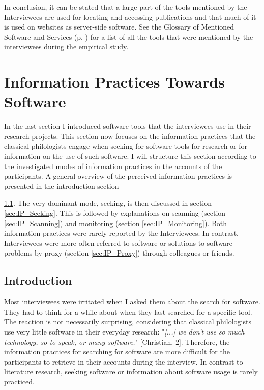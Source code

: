 \documentclass[12pt, a4paper, titlepage, oneside, abstract=true, toc=listof, toc=bibliography]{scrreprt}
\begin{document}
In conclusion, it can be stated that a large part of the tools mentioned by the Interviewees are used for locating and accessing publications and that much of it is used on websites as server-side software. See the Glossary of Mentioned Software and Services (p. \pageref{sec:glossary}) for a list of all the tools that were mentioned by the interviewees during the empirical study.

\section{Information Practices Towards Software}
\label{sec:IP_SW}
In the last section I introduced software tools that the interviewees use in their research projects. This section now focuses on the information practices that the classical philologists engage when seeking for software tools for research or for information on the use of such software. I will structure this section according to the investigated modes of information practices in the accounts of the participants. A general overview of the perceived information practices is presented in the introduction section {\ref{sec:IP_Introduction}. The very dominant mode, seeking, is then discussed in section \ref{sec:IP_Seeking}. This is followed by explanations on scanning (section \ref{sec:IP_Scanning}) and monitoring (section \ref{sec:IP_Monitoring}). Both information practices were rarely reported by the Interviewees. In contrast, Interviewees were more often referred to software or solutions to software problems by proxy (section \ref{sec:IP_Proxy}) through colleagues or friends.

\subsection{Introduction}
\label{sec:IP_Introduction}
Most interviewees were irritated when I asked them about the search for software. They had to think for a while about when they last searched for a specific tool. The reaction is not necessarily surprising, considering that classical philologists use very little software in their everyday research: "\textit{[...] we don't use so much technology, so to speak, or many software.}" [Christian, 2]. Therefore, the information practices for searching for software are more difficult for the participants to retrieve in their accounts during the interview. In contrast to literature research, seeking software or information about software usage is rarely practiced. 

}
\end{document}
